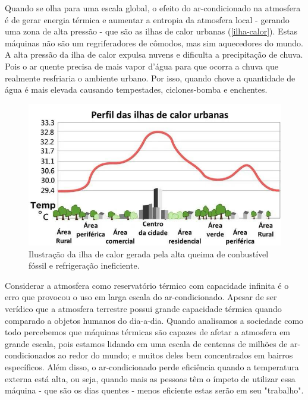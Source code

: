 Quando se olha para uma escala global, o efeito do ar-condicionado na atmosfera é de gerar energia térmica e aumentar a entropia da atmosfera local - gerando uma zona de alta pressão - que são as ilhas de calor urbanas (\autoref{ilha-calor}). Estas máquinas não são um regriferadores de cômodos, mas sim aquecedores do mundo. A alta pressão da ilha de calor expulsa nuvens e dificulta a precipitação de chuva. Pois o ar quente precisa de mais vapor d'água para que ocorra a chuva que realmente resfriaria o ambiente urbano. Por isso, quando chove a quantidade de água é mais elevada causando tempestades, ciclones-bomba e enchentes. 

\begin{figure}[h]
    \centering
    \includegraphics[scale=0.6]{pictures/ilha-calor.jpg}
    \caption{Ilustração da ilha de calor gerada pela alta queima de conbustível fóssil e refrigeração ineficiente.}
    \label{ilha-calor}
\end{figure}

Considerar a atmosfera como reservatório térmico com capacidade infinita é o erro que provocou o uso em larga escala do ar-condicionado. Apesar de ser verídico que a atmosfera terrestre possui grande capacidade térmica quando comparado a objetos humanos do dia-a-dia. Quando analisamos a sociedade como todo percebemos que máquinas térmicas são capazes de afetar a atmosfera em grande escala, pois estamos lidando em uma escala de centenas de milhões de ar-condicionados ao redor do mundo; e muitos deles bem concentrados em bairros específicos. 
Além disso, o ar-condicionado perde eficiência quando a temperatura externa está alta, ou seja, quando mais as pessoas têm o ímpeto de utilizar essa máquina - que são os dias quentes - menos eficiente estas serão em seu "trabalho".

                                        